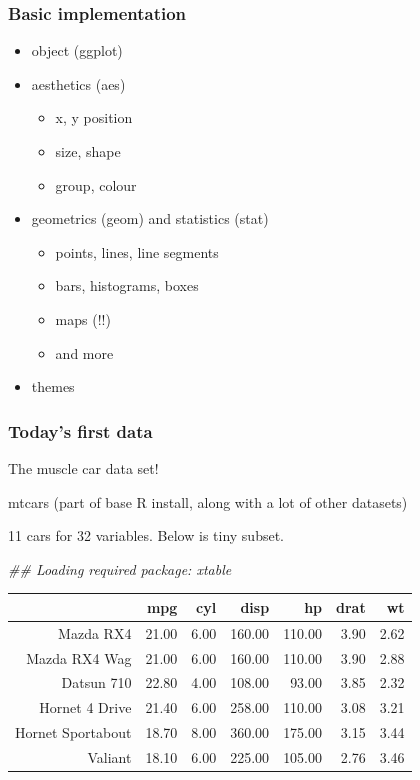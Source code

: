 \documentclass{beamer}\usepackage{graphicx, color}
\makeatletter
\newenvironment{kframe}{%
 \def\at@end@of@kframe{}%
 \ifinner\ifhmode%
  \def\at@end@of@kframe{\end{minipage}}%
  \begin{minipage}{\columnwidth}%
 \fi\fi%
 \def\FrameCommand##1{\hskip\@totalleftmargin \hskip-\fboxsep
 \colorbox{shadecolor}{##1}\hskip-\fboxsep
     \hskip-\linewidth \hskip-\@totalleftmargin \hskip\columnwidth}%
 \MakeFramed {\advance\hsize-\width
   \@totalleftmargin\z@ \linewidth\hsize
   \@setminipage}}%
 {\par\unskip\endMakeFramed%
 \at@end@of@kframe}
\makeatother
\begin{document}
\begin{frame}
  \frametitle{Basic implementation}
  \begin{itemize}
    \item object (ggplot)
    \item aesthetics (aes)
      \begin{itemize}
        \item x, y position
        \item size, shape
        \item group, colour
      \end{itemize}
    \item geometrics (geom) and statistics (stat)
      \begin{itemize}
        \item points, lines, line segments
        \item bars, histograms, boxes
        \item maps (!!)
        \item and more
      \end{itemize}
    \item themes
  \end{itemize}

\end{frame}

\begin{frame}
  \frametitle{Today's first data}

  The muscle car data set!

  mtcars (part of base R install, along with a lot of other datasets)

  11 cars for 32 variables. Below is tiny subset.

\begin{kframe}


{\ttfamily\noindent\itshape\textcolor{messagecolor}{\#\# Loading required package: xtable}}\end{kframe}%
\begin{table}[ht]
\begin{center}
\begin{tabular}{rrrrrrr}
  \hline
 & mpg & cyl & disp & hp & drat & wt \\ 
  \hline
Mazda RX4 & 21.00 & 6.00 & 160.00 & 110.00 & 3.90 & 2.62 \\ 
  Mazda RX4 Wag & 21.00 & 6.00 & 160.00 & 110.00 & 3.90 & 2.88 \\ 
  Datsun 710 & 22.80 & 4.00 & 108.00 & 93.00 & 3.85 & 2.32 \\ 
  Hornet 4 Drive & 21.40 & 6.00 & 258.00 & 110.00 & 3.08 & 3.21 \\ 
  Hornet Sportabout & 18.70 & 8.00 & 360.00 & 175.00 & 3.15 & 3.44 \\ 
  Valiant & 18.10 & 6.00 & 225.00 & 105.00 & 2.76 & 3.46 \\ 
   \hline
\end{tabular}
\end{center}
\end{table}



\end{frame}
\end{document}
